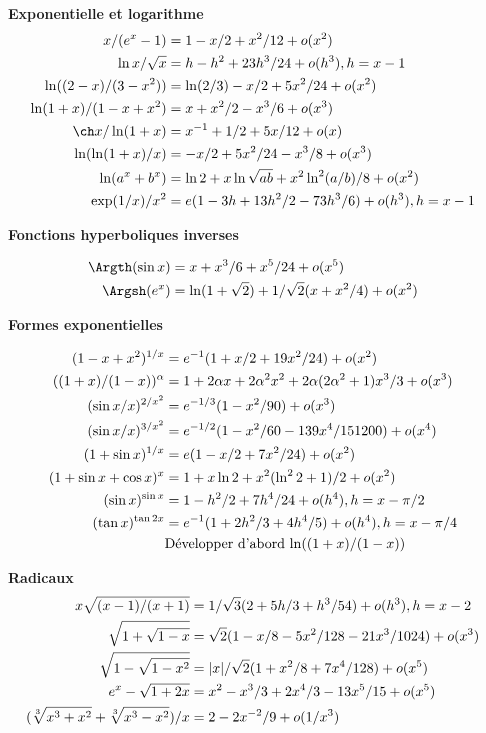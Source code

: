 {{\textbf{Exponentielle et logarithme}
%
\begin{align*}
x/(e^x-1)          &= 1 - x/2 + x^2/12  + o(x^2)                       \cr
\ln x/\sqrt x      &= h - h^2 + 23h^3/24   + o(h^3), h = x-1           \cr
\ln((2-x)/(3-x^2)) &= \ln(2/3) - x/2 + 5x^2/24  + o(x^2)               \cr
\ln(1+x)/(1-x+x^2) &= x + x^2/2 - x^3/6   + o(x^3)                     \cr
\ch x/\ln(1+x)     &= x^{-1} + 1/2 + 5x/12    + o(x)                 \cr
\ln(\ln(1+x)/x)    &= -x/2 + 5x^2/24 - x^3/8 + o(x^3)                  \cr
\ln(a^x+b^x)       &= \ln2 + x\ln\sqrt{ab} + x^2\ln^2(a/b)/8 + o(x^2)  \cr
\exp(1/x)/x^2      &= e(1 - 3h + 13h^2/2 - 73h^3/6)  + o(h^3), h = x-1         \cr
\end{align*}

\textbf{Fonctions hyperboliques inverses}
%

\begin{align*}
\Argth(\sin x)   &= x + x^3/6 + x^5/24  + o(x^5)                  \cr
\Argsh(e^x)      &= \ln(1+\sqrt2) + 1/\sqrt2(x + x^2/4)  + o(x^2) \cr
\end{align*}


\textbf{Formes exponentielles}
%

\begin{align*}
(1-x+x^2)^{1/x}       &= e^{-1}(1 + x/2 + 19x^2/24) + o(x^2)           \cr
((1+x)/(1-x))^\alpha  &= 1 + 2\alpha x + 2\alpha^2x^2 + 2\alpha(2\alpha^2+1)x^3/3 + o(x^3) \cr
(\sin x/x)^{2/x^2}    &= e^{-1/3}(1 - x^2/90) + o(x^3)                \cr
(\sin x/x)^{3/x^2}    &= e^{-1/2}(1 - x^2/60 - 139x^4/151200)+ o(x^4) \cr
(1+\sin x)^{1/x}      &= e(1 - x/2 + 7x^2/24)  + o(x^2)                \cr
(1+\sin x + \cos x)^x &= 1 + x\ln2 + x^2(\ln^22+1)/2  + o(x^2)         \cr
(\sin x)^{\sin x}     &= 1 - h^2/2 + 7h^4/24  + o(h^4), h = x-\pi/2                 \cr
(\tan x)^{\tan2x}     &= e^{-1}(1 + 2h^2/3 + 4h^4/5)   + o(h^4), h = x-\pi/4     \cr
                      &   \text{Développer d'abord $\ln((1+x)/(1-x))$}   \cr
\end{align*}

\textbf{Radicaux}
%
\begin{align*}
x\sqrt{(x-1)/(x+1)}   &= 1/\sqrt3(2 + 5h/3 + h^3/54)  + o(h^3), h = x-2              \cr
\sqrt{1+\sqrt{1-x}}   &= \sqrt2(1 - x/8 - 5x^2/128 - 21x^3/1024) + o(x^3)  \cr
\sqrt{1-\sqrt{1-x^2}} &= |x|/\sqrt2(1 + x^2/8 + 7x^4/128) + o(x^5)        \cr
e^x-\sqrt{1+2x}       &= x^2 - x^3/3 + 2x^4/3 - 13x^5/15  + o(x^5)        \cr
(\sqrt[3]{x^3+x^2}+\sqrt[3]{x^3-x^2})/x &= 2 - 2x^{-2}/9  + o(1/x^3)          \cr
\end{align*}}
  \reponse{}
}